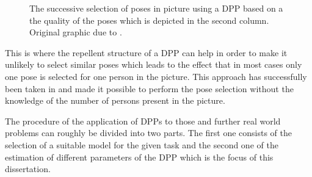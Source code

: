 \begin{enumerate}
\begin{figure}[h!]
	\caption{The successive selection of poses in picture using a DPP based on a the quality of the poses which is depicted in the second column. Original graphic due to \cite{kulesza2010structured}.}
	\label{fig:1}
\end{figure}
 This is where the repellent structure of a DPP can help in order to make it unlikely to select similar poses which leads to the effect that in most cases only one pose is selected for one person in the picture. This approach has successfully been taken in \cite{kulesza2010structured} and made it possible to perform the pose selection without the knowledge of the number of persons present in the picture.
\end{enumerate}

The procedure of the application of DPPs to those and further real world problems can roughly be divided into two parts. The first one consists of the selection of a suitable model for the given task and the second one of the estimation of 
different parameters of the DPP which is the focus of this dissertation. %

